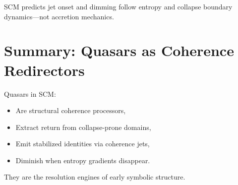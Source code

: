 SCM predicts jet onset and dimming follow entropy and collapse boundary dynamics—not accretion mechanics.

\section{Summary: Quasars as Coherence Redirectors} \label{sec:quasar-summary}

Quasars in SCM:
\begin{itemize}
  \item Are structural coherence processors,
  \item Extract return from collapse-prone domains,
  \item Emit stabilized identities via coherence jets,
  \item Diminish when entropy gradients disappear.
\end{itemize}

They are the resolution engines of early symbolic structure.

